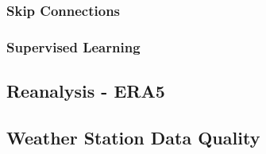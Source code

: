 \subsubsection*{Skip Connections}


\subsubsection*{Supervised Learning}

\subsection{Reanalysis - ERA5}

\subsection{Weather Station Data Quality}